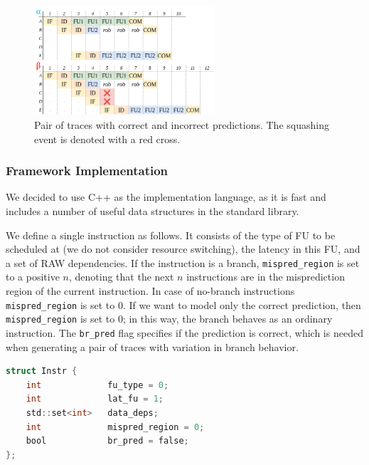 \begin{figure}[H]
	\centering
	\includegraphics[width=0.6\textwidth]{figures/mispred-intro.png}
	\caption{Pair of traces with correct and incorrect predictions. The squashing event is denoted with a red cross.}
	\label{fig:mispred-intro}
\end{figure}



\subsubsection{Framework Implementation}

We decided to use C++ \cite{stroustrup_c_2015} as the implementation language, as it is fast and includes a number of useful data structures in the standard library.

We define a single instruction as follows. It consists of the type of FU to be scheduled at (we do not consider resource switching), the latency in this FU, and a set of RAW dependencies. If the instruction is a branch, \texttt{mispred\_region} is set to a positive $n$, denoting that the next $n$ instructions are in the misprediction region of the current instruction. In case of no-branch instructions \texttt{mispred\_region} is set to $0$. If we want to model only the correct prediction, then \texttt{mispred\_region} is set to 0; in this way, the branch behaves as an ordinary instruction. The \texttt{br\_pred} flag specifies if the prediction is correct, which is needed when generating a pair of traces with variation in branch behavior.

\begin{lstlisting}[language=C]
struct Instr {
    int 			fu_type = 0;
    int 			lat_fu = 1;
    std::set<int> 	data_deps;
    int 			mispred_region = 0;
    bool 			br_pred = false;
};
\end{lstlisting}

